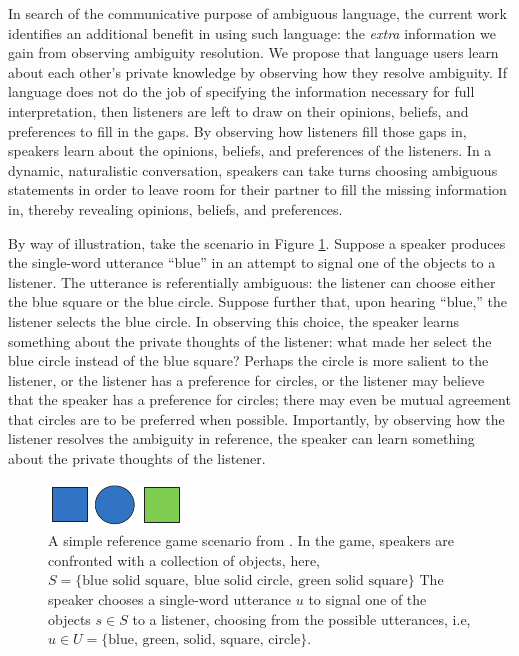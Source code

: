 \documentclass[10pt,a4paper]{article}
\begin{document}
In search of the communicative purpose of ambiguous language, the current work identifies an additional benefit in using such language: the \emph{extra} information we gain from observing ambiguity resolution.
We propose that language users learn about each other's private knowledge by observing how they resolve ambiguity. If language does not do the job of specifying the information necessary for full interpretation, then listeners are left to draw on their opinions, beliefs, and preferences to fill in the gaps. By observing how listeners fill those gaps in, speakers learn about the opinions, beliefs, and preferences of the listeners.
In a dynamic, naturalistic conversation, speakers can take turns choosing ambiguous statements in order to leave room for their partner to fill the missing information in, thereby revealing opinions, beliefs, and preferences. 


By way of illustration, take the scenario in Figure \ref{FG-ref-game}.
Suppose a speaker produces the single-word utterance ``blue'' in an attempt to signal one of the objects to a listener. The utterance is referentially ambiguous: the listener can choose either the blue square or the blue circle. Suppose further that, upon hearing ``blue,'' the listener selects the blue circle. In observing this choice, the speaker learns something about the private thoughts of the listener: what made her select the blue circle instead of the blue square? Perhaps the circle is more salient to the listener, or the listener has a preference for circles, or the listener may believe that the speaker has a preference for circles; there may even be mutual agreement that circles are to be preferred when possible. Importantly, by observing how the listener resolves the ambiguity in reference, the speaker can learn something about the private thoughts of the listener. 

\begin{figure}
	\centering
	\includegraphics[width=.5\linewidth]{images/rsascene-eps-converted-to.pdf}
	\caption{A simple reference game scenario from \protect{}.
		In the game, speakers are confronted with a collection of objects, 
		here, $S=\{\textrm{blue\ solid\ square},\ \textrm{blue\ solid\ circle},\ \textrm{green\ solid\ square}\} $
		The speaker chooses a single-word utterance $u$ to signal one of the objects $s\in S$ to a listener, choosing from the 
		possible utterances, i.e, $u\in U=\{\textrm{blue,\ green,\ solid,\ square,\ circle} \}$.
	}
	\label{FG-ref-game}
\end{figure}
\end{document}
